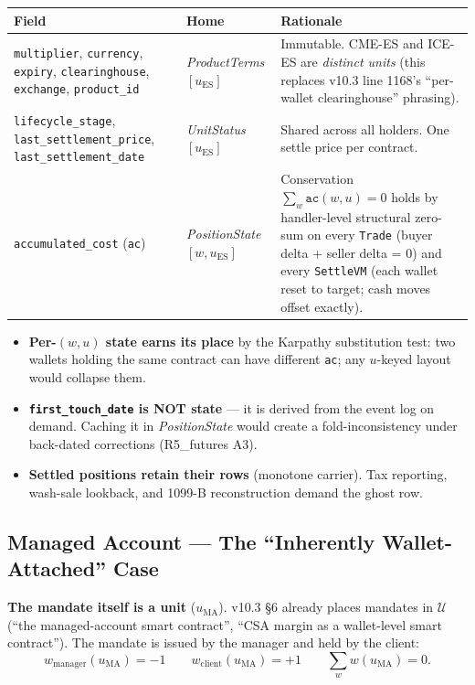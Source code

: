 \documentclass[11pt,a4paper]{article}
\begin{document}
\begin{longtable}{p{5.5cm}p{3.5cm}p{6cm}}
\toprule
\textbf{Field} & \textbf{Home} & \textbf{Rationale} \\
\midrule
\texttt{multiplier}, \texttt{currency}, \texttt{expiry}, \texttt{clearinghouse}, \texttt{exchange}, \texttt{product\_id} & \textit{ProductTerms}$[u_{\mathrm{ES}}]$ & Immutable. CME-ES and ICE-ES are \emph{distinct units} (this replaces v10.3 line 1168's ``per-wallet clearinghouse'' phrasing). \\
\addlinespace
\texttt{lifecycle\_stage}, \texttt{last\_settlement\_price}, \texttt{last\_settlement\_date} & \textit{UnitStatus}$[u_{\mathrm{ES}}]$ & Shared across all holders. One settle price per contract. \\
\addlinespace
\texttt{accumulated\_cost} (\texttt{ac}) & \textit{PositionState}$[w, u_{\mathrm{ES}}]$ & Conservation $\sum_w \texttt{ac}(w, u) = 0$ holds by handler-level structural zero-sum on every \texttt{Trade} (buyer delta + seller delta = 0) and every \texttt{SettleVM} (each wallet reset to target; cash moves offset exactly). \\
\bottomrule
\end{longtable}

\begin{itemize}[leftmargin=*]
\item \textbf{Per-$(w, u)$ state earns its place} by the Karpathy substitution test: two wallets holding the same contract can have different \texttt{ac}; any $u$-keyed layout would collapse them.
\item \textbf{\texttt{first\_touch\_date} is NOT state} --- it is derived from the event log on demand. Caching it in \textit{PositionState} would create a fold-inconsistency under back-dated corrections (R5\_futures A3).
\item \textbf{Settled positions retain their rows} (monotone carrier). Tax reporting, wash-sale lookback, and 1099-B reconstruction demand the ghost row.
\end{itemize}

\subsection{Managed Account --- The ``Inherently Wallet-Attached'' Case}

\textbf{The mandate itself is a unit} ($u_{\mathrm{MA}}$). v10.3 \S 6 already places mandates in $\mathcal{U}$ (``the managed-account smart contract'', ``CSA margin as a wallet-level smart contract''). The mandate is issued by the manager and held by the client:
\[
w_{\mathrm{manager}}(u_{\mathrm{MA}}) = -1 \qquad w_{\mathrm{client}}(u_{\mathrm{MA}}) = +1 \qquad \sum_w w(u_{\mathrm{MA}}) = 0.
\]
\end{document}
